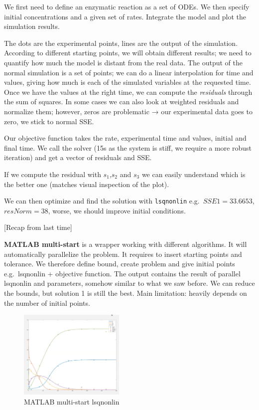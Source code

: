We first need to define an enzymatic reaction as a set of ODEs. We then
specify initial concentrations and a given set of rates. Integrate the
model and plot the simulation results.

The dots are the experimental points, lines are the output of the
simulation. According to different starting points, we will obtain
different results; we need to quantify how much the model is distant
from the real data. The output of the normal simulation is a set of
points; we can do a linear interpolation for time and values, giving how
much is each of the simulated variables at the requested time. Once we
have the values at the right time, we can compute the \emph{residuals}
through the sum of squares. In some cases we can also look at weighted
residuals and normalize them; however, zeros are problematic → our
experimental data goes to zero, we stick to normal SSE.

Our objective function takes the rate, experimental time and values,
initial and final time. We call the solver (15s as the system is stiff,
we require a more robust iteration) and get a vector of residuals and
SSE.

If we compute the residual with $s_1$,$s_2$ and $s_3$ we can easily understand
which is the better one (matches visual inspection of the plot).

We can then optimize and find the solution with \texttt{lsqnonlin}
e.g.~$SSE1 = 33.6653$, $resNorm = 38$, worse, we should improve initial
conditions.

{[}Recap from last time{]}

\textbf{MATLAB multi-start} is a wrapper working with different
algorithms. It will automatically parallelize the problem. It requires
to insert starting points and tolerance. We therefore define bound,
create problem and give initial points e.g.~lsqnonlin + objective
function. The output contains the result of parallel lsqnonlin and
parameters, somehow similar to what we saw before. We can reduce the
bounds, but solution 1 is still the best. Main limitation: heavily
depends on the number of initial points.

\begin{figure}
\centering
\includegraphics[width=0.45\textwidth]{multistep.png}
\caption{MATLAB multi-start lsqnonlin}
\end{figure}

